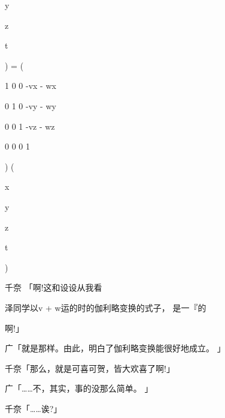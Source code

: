 y\par
z\par
t\par
) = (\par
1 0 0 -vx - wx\par
0 1 0 -vy - wy\par
0 0 1 -vz - wz\par
0 0 0 1\par
) (\par
x\par
y\par
z\par
t\par
)\par
千奈 「啊!这和设设从我看\par
泽同学以v + w运的时的伽利略变换的式子， 是一『的\par
啊!」\par
广「就是那样。由此，明白了伽利略变换能很好地成立。 」\par
千奈「那么，就是可喜可贺，皆大欢喜了啊!」\par
广「……不，其实，事的没那么简单。 」\par
千奈「……诶?」\par

